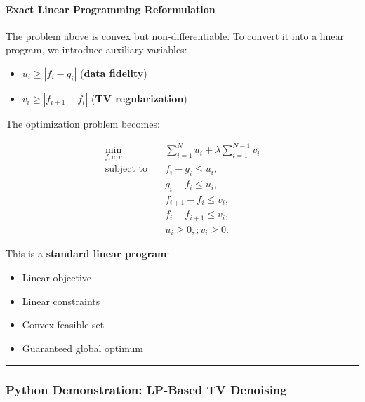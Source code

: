 \documentclass[11pt]{article}
\providecommand{\tightlist}{%
      \setlength{\itemsep}{0pt}\setlength{\parskip}{0pt}}
\begin{document}
\hypertarget{exact-linear-programming-reformulation}{%
\paragraph{\texorpdfstring{\textbf{Exact Linear Programming
Reformulation}}{Exact Linear Programming Reformulation}}\label{exact-linear-programming-reformulation}}

The problem above is convex but non-differentiable. To convert it into a
linear program, we introduce auxiliary variables:

\begin{itemize}
\tightlist
\item
  \(u_i \ge |f_i - g_i|\) (\textbf{data fidelity})
\item
  \(v_i \ge |f_{i+1} - f_i|\) (\textbf{TV regularization})
\end{itemize}

The optimization problem becomes:

\[\begin{aligned}
\min_{f,u,v} \quad &
\sum_{i=1}^N u_i + \lambda \sum_{i=1}^{N-1} v_i \\
\text{subject to} \quad
& f_i - g_i \le u_i, \\
& g_i - f_i \le u_i, \\
& f_{i+1} - f_i \le v_i, \\
& f_i - f_{i+1} \le v_i, \\
& u_i \ge 0,; v_i \ge 0.
\end{aligned}\]

This is a \textbf{standard linear program}:

\begin{itemize}
\tightlist
\item
  Linear objective
\item
  Linear constraints
\item
  Convex feasible set
\item
  Guaranteed global optimum
\end{itemize}

\begin{center}\rule{0.5\linewidth}{0.5pt}\end{center}

\hypertarget{python-demonstration-lp-based-tv-denoising}{%
\subsubsection{Python Demonstration: LP-Based TV
Denoising}\label{python-demonstration-lp-based-tv-denoising}}
\end{document}
